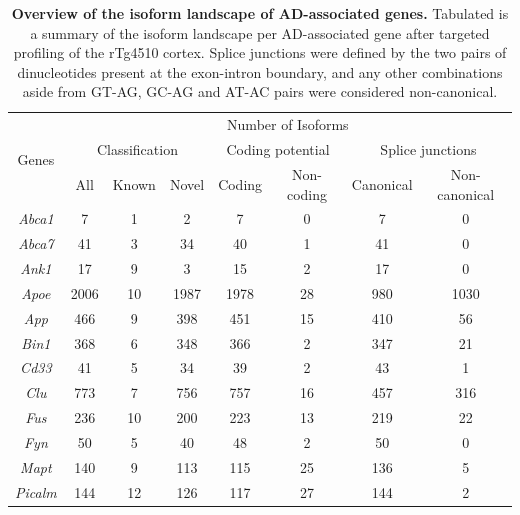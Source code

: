 \vspace{1cm}
\begin{table}[]
	\centering
	\captionsetup{width=0.95\textwidth}
	\caption[Overview of the isoform landscape of AD-associated genes]%
	{\textbf{Overview of the isoform landscape of AD-associated genes.} Tabulated is a summary of the isoform landscape per AD-associated gene after targeted profiling of the rTg4510 cortex. Splice junctions were defined by the two pairs of dinucleotides present at the exon-intron boundary, and any other combinations aside from GT-AG, GC-AG and AT-AC pairs were considered non-canonical.}
	\label{tab: merged_targeted_num}
	\centering
	\setlength\tabcolsep{5pt} %
	\begin{tabular}{@{}cccccccc@{}}
		\toprule
		\multirow{3}{*}{Genes} & \multicolumn{7}{c}{Number of Isoforms}                                                                    \\ \cmidrule(l){2-8} 
		& \multicolumn{3}{c}{Classification} & \multicolumn{2}{c}{Coding potential} & \multicolumn{2}{c}{Splice junctions} \\ \cmidrule(l){2-8} 
		& All      & Known      & Novel      & Coding          & Non-coding         & Canonical     & Non-canonical    \\ \midrule
		\textit{Abca1}  & 7    & 1  & 2    & 7    & 0   & 7   & 0    \\
		\textit{Abca7}  & 41   & 3  & 34   & 40   & 1   & 41  & 0    \\
		\textit{Ank1}   & 17   & 9  & 3    & 15   & 2   & 17  & 0    \\
		\textit{Apoe}   & 2006 & 10 & 1987 & 1978 & 28  & 980 & 1030 \\
		\textit{App}    & 466  & 9  & 398  & 451  & 15  & 410 & 56   \\
		\textit{Bin1}   & 368  & 6  & 348  & 366  & 2   & 347 & 21   \\
		\textit{Cd33}   & 41   & 5  & 34   & 39   & 2   & 43  & 1    \\
		\textit{Clu}    & 773  & 7  & 756  & 757  & 16  & 457 & 316  \\
		\textit{Fus}    & 236  & 10 & 200  & 223  & 13  & 219 & 22   \\
		\textit{Fyn}    & 50   & 5  & 40   & 48   & 2   & 50  & 0    \\
		\textit{Mapt}   & 140  & 9  & 113  & 115  & 25  & 136 & 5    \\
		\textit{Picalm} & 144  & 12 & 126  & 117  & 27  & 144 & 2    \\

\end{tabular}
\end{table}
